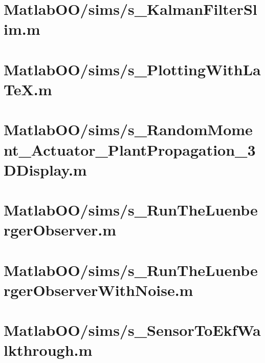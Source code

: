 \pagebreak
\section{MatlabOO/sims/s\_KalmanFilterSlim.m}\label{code:MatlabOO/sims/s_KalmanFilterSlim.m}


\pagebreak
\section{MatlabOO/sims/s\_PlottingWithLaTeX.m}\label{code:MatlabOO/sims/s_PlottingWithLaTeX.m}


\pagebreak
\section{MatlabOO/sims/s\_RandomMoment\_Actuator\_PlantPropagation\_3DDisplay.m}\label{code:MatlabOO/sims/s_RandomMoment_Actuator_PlantPropagation_3DDisplay.m}


\pagebreak
\section{MatlabOO/sims/s\_RunTheLuenbergerObserver.m}\label{code:MatlabOO/sims/s_RunTheLuenbergerObserver.m}


\pagebreak
\section{MatlabOO/sims/s\_RunTheLuenbergerObserverWithNoise.m}\label{code:MatlabOO/sims/s_RunTheLuenbergerObserverWithNoise.m}


\pagebreak
\section{MatlabOO/sims/s\_SensorToEkfWalkthrough.m}\label{code:MatlabOO/sims/s_SensorToEkfWalkthrough.m}


